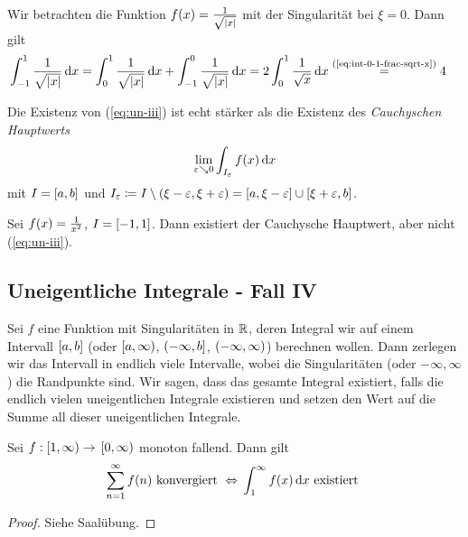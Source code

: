\begin{beispiel}
    Wir betrachten die Funktion $f\of{x} = \frac{1}{\sqrt{\abs{x}}}$ mit der Singularität bei $\xi = 0$. Dann gilt
    \begin{align*}
        \int_{-1}^{1} \frac{1}{\sqrt{\abs{x}}} \dif x &= \int_{0}^{1} \frac{1}{\sqrt{\abs{x}}} \dif x + \int_{-1}^{0} \frac{1}{\sqrt{\abs{x}}} \dif x = 2\int_{0}^{1} \frac{1}{\sqrt{x}} \dif x \annot{=}{(\ref{eq:int-0-1-frac-sqrt-x})} 4
    \end{align*}
\end{beispiel}

\begin{bemerkung}
    Die Existenz von (\ref{eq:un-iii}) ist echt stärker als die Existenz des \emph{Cauchyschen Hauptwerts}
    \begin{align*}
        \lim_{\varepsilon\searrow 0} \int_{I_{\varepsilon}}^{} f\of{x} \dif x
    \end{align*}
    mit $I=\interv{a,b}$ und $I_{\varepsilon}\coloneqq I\exclude\pair{\xi-\varepsilon, \xi+\varepsilon} = \interv{a, \xi-\varepsilon} \cup \interv{\xi+\varepsilon, b}$.
\end{bemerkung}

\begin{beispiel}
    Sei $f\of{x} = \frac{1}{x^2}$, $I=\interv{-1, 1}$. Dann existiert der Cauchysche Hauptwert, aber nicht (\ref{eq:un-iii}).
\end{beispiel}

\subsection{Uneigentliche Integrale - Fall IV}

\begin{definition}
    Sei $f$ eine Funktion mit Singularitäten in $\R$, deren Integral wir auf einem Intervall $\interv{a,b}$ (oder $\linterv{a, \infty}$, $\rinterv{-\infty, b}$, $\pair{-\infty, \infty}$) berechnen wollen. Dann zerlegen wir das Intervall in endlich viele Intervalle, wobei die Singularitäten (oder $-\infty, \infty$) die Randpunkte sind. Wir sagen, dass das gesamte Integral existiert, falls die endlich vielen uneigentlichen Integrale existieren und setzen den Wert auf die Summe all dieser uneigentlichen Integrale.
\end{definition}

\begin{satz}[Integralvergleichskriterium] %
    \label{satz:integral-vergleich}
    Sei $f: \linterv{1, \infty} \fromto\linterv{0, \infty}$ monoton fallend. Dann gilt
    \begin{align*}
        \sum_{n=1}^{\infty}  f\of{n} \text{ konvergiert } \equivalent \int_{1}^{\infty} f\of{x} \dif x \text{ existiert }
    \end{align*}
    \begin{proof}
        Siehe Saalübung.
    \end{proof}
\end{satz}

